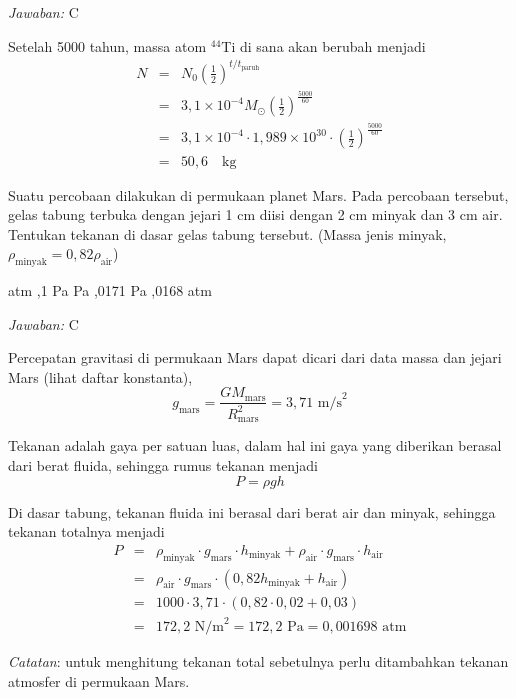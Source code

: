 \documentclass[11pt,fleqn]{exam}
\begin{document}
\begin{questions}
\textit{Jawaban: } C

Setelah 5000 tahun, massa atom $^{44}$Ti di sana akan berubah menjadi
\begin{eqnarray*}
N &=& N_0 \left( \frac{1}{2} \right)^{t/t_\text{paruh}}\\
&=& 3,1 \times 10^{-4} M_{\odot} \left( \frac{1}{2} \right)^{\frac{5000}{60}}\\
&=& 3,1 \times 10^{-4} \cdot 1,989 \times 10^{30} \cdot \left( \frac{1}{2} \right)^{\frac{5000}{60}}\\
&=& 50,6 \quad \text{kg}
\end{eqnarray*}



\question Suatu percobaan dilakukan di permukaan planet Mars. Pada percobaan tersebut, gelas tabung terbuka dengan jejari 1 cm diisi dengan 2 cm minyak dan 3 cm air. Tentukan tekanan di dasar gelas tabung tersebut. (Massa jenis minyak, $\rho_{\text{minyak}} = 0,82 \rho_{\text{air}} $)
\begin{choices}
 atm
,1 Pa
 Pa
,0171 Pa
,0168 atm
\end{choices}

\textit{Jawaban: } C

Percepatan gravitasi di permukaan Mars dapat dicari dari data massa dan jejari Mars (lihat daftar konstanta),
$$g_{\text{mars}} = \frac{GM_{\text{mars}}}{R^2_{\text{mars}}} = 3,71 \text{  m/s}^2$$ 

Tekanan adalah gaya per satuan luas, dalam hal ini gaya yang diberikan berasal dari berat fluida, sehingga rumus tekanan menjadi
$$P = \rho g h$$

Di dasar tabung, tekanan fluida ini berasal dari berat air dan minyak, sehingga tekanan totalnya menjadi 
\begin{eqnarray*}
P &=& \rho_{\text{minyak}} \cdot g_{\text{mars}} \cdot h_{\text{minyak}} + \rho_{\text{air}} \cdot g_{\text{mars}} \cdot h_{\text{air}} \\
&=& \rho_{\text{air}} \cdot g_{\text{mars}} \cdot (0,82 h_{\text{minyak}} + h_{\text{air}})\\
&=& 1000 \cdot 3,71 \cdot (0,82 \cdot 0,02 + 0,03)\\
&=& 172,2 \text{  N/m}^2 = 172,2 \text{ Pa} = 0,001698 \text{ atm}
\end{eqnarray*}

\textit{Catatan}: untuk menghitung tekanan total sebetulnya perlu ditambahkan tekanan atmosfer di permukaan Mars.


\end{questions}
\end{document}
